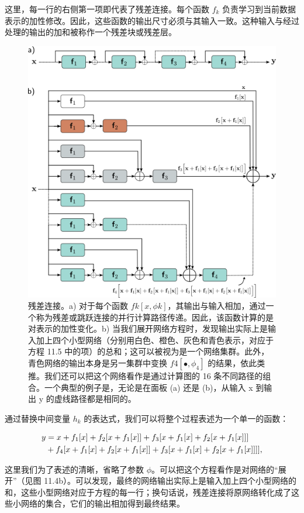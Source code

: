 这里，每一行的右侧第一项即代表了残差连接。每个函数 \(f_k\) 负责学习到当前数据表示的加性修改。因此，这些函数的输出尺寸必须与其输入一致。这种输入与经过处理的输出的加和被称作一个残差块或残差层。

\begin{figure}[ht!]
\centering
\includegraphics[width=0.7\linewidth]{png/chapter11/ResidualUnravel.png}
\caption{残差连接。a) 对于每个函数 \(fk[x, \phi k]\)，其输出与输入相加，通过一个称为残差或跳跃连接的并行计算路径传递。因此，该函数计算的是对表示的加性变化。b) 当我们展开网络方程时，发现输出实际上是输入加上四个小型网络（分别用白色、橙色、灰色和青色表示，对应于方程 11.5 中的项）的总和；这可以被视为是一个网络集群。此外，青色网络的输出本身是另一集群中变换 \(f4[•,\phi_4]\) 的结果，依此类推。我们还可以把这个网络看作是通过计算图的 16 条不同路径的组合。一个典型的例子是，无论是在面板 (a) 还是 (b)，从输入 x 到输出 y 的虚线路径都是相同的。}
\end{figure}


通过替换中间变量 \(h_k\) 的表达式，我们可以将整个过程表述为一个单一的函数：

\begin{align}
y &= x + f_1[x] + f_2[x + f_1[x]] + f_3[x + f_1[x] + f_2[x + f_1[x]]] \notag \\
&+ f_4[x + f_1[x] + f_2[x + f_1[x]] + f_3[x + f_1[x] + f_2[x + f_1[x]]]], 
\end{align}

这里我们为了表述的清晰，省略了参数 \(\phi\)。可以把这个方程看作是对网络的“展开”（见图 11.4b）。可以发现，最终的网络输出实际上是输入加上四个小型网络的和，这些小型网络对应于方程的每一行；换句话说，残差连接将原网络转化成了这些小网络的集合，它们的输出相加得到最终结果。

